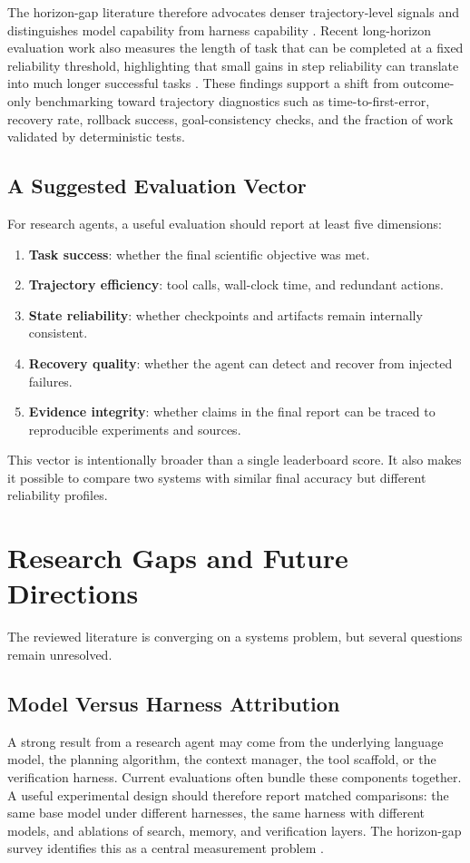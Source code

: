 \documentclass[manuscript,screen]{acmart}
\begin{document}
The horizon-gap literature therefore advocates denser trajectory-level signals and distinguishes model capability from harness capability \cite{chen2026horizongap}. Recent long-horizon evaluation work also measures the length of task that can be completed at a fixed reliability threshold, highlighting that small gains in step reliability can translate into much longer successful tasks \cite{sinha2025illusion}. These findings support a shift from outcome-only benchmarking toward trajectory diagnostics such as time-to-first-error, recovery rate, rollback success, goal-consistency checks, and the fraction of work validated by deterministic tests.

\subsection{A Suggested Evaluation Vector}
For research agents, a useful evaluation should report at least five dimensions:
\begin{enumerate}
    \item \textbf{Task success}: whether the final scientific objective was met.
    \item \textbf{Trajectory efficiency}: tool calls, wall-clock time, and redundant actions.
    \item \textbf{State reliability}: whether checkpoints and artifacts remain internally consistent.
    \item \textbf{Recovery quality}: whether the agent can detect and recover from injected failures.
    \item \textbf{Evidence integrity}: whether claims in the final report can be traced to reproducible experiments and sources.
\end{enumerate}

This vector is intentionally broader than a single leaderboard score. It also makes it possible to compare two systems with similar final accuracy but different reliability profiles.

\section{Research Gaps and Future Directions}\label{sec:gaps}
The reviewed literature is converging on a systems problem, but several questions remain unresolved.

\subsection{Model Versus Harness Attribution}
A strong result from a research agent may come from the underlying language model, the planning algorithm, the context manager, the tool scaffold, or the verification harness. Current evaluations often bundle these components together. A useful experimental design should therefore report matched comparisons: the same base model under different harnesses, the same harness with different models, and ablations of search, memory, and verification layers. The horizon-gap survey identifies this as a central measurement problem \cite{chen2026horizongap}.
\end{document}
